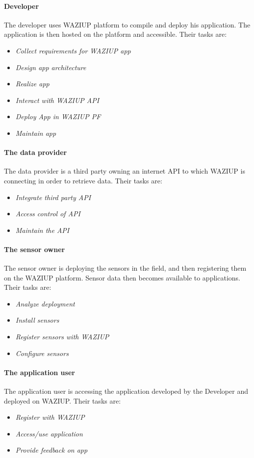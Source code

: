 \paragraph{Developer}
The developer uses WAZIUP platform to compile and deploy his application. 
The application is then hosted on the platform and accessible. 
Their tasks are:
\begin{itemize}
	\item \emph{Collect requirements for WAZIUP app}
	\item \emph{Design app architecture}
	\item \emph{Realize app}
	\item \emph{Interact with WAZIUP API}
	\item \emph{Deploy App in WAZIUP PF}
	\item \emph{Maintain app}
\end{itemize}

\paragraph{The data provider}
The data provider is a third party owning an internet API to which WAZIUP is connecting in order to retrieve data. 
Their tasks are:
\begin{itemize}
	\item \emph{Integrate third party API}
	\item \emph{Access control of API}
	\item \emph{Maintain the API}
\end{itemize}

\paragraph{The sensor owner }
The sensor owner is deploying the sensors in the field, and then registering them on the WAZIUP platform. Sensor data then becomes available to applications. Their tasks are:
\begin{itemize}
	\item \emph{Analyze deployment}
	\item \emph{Install sensors}
	\item \emph{Register sensors with WAZIUP}
	\item \emph{Configure sensors }
\end{itemize}

\paragraph{The application user}
The application user is accessing the application developed by the Developer and deployed on WAZIUP. Their tasks are:
\begin{itemize}
	\item \emph{Register with WAZIUP}
	\item \emph{Access/use application}
	\item \emph{Provide feedback on app}
\end{itemize}

